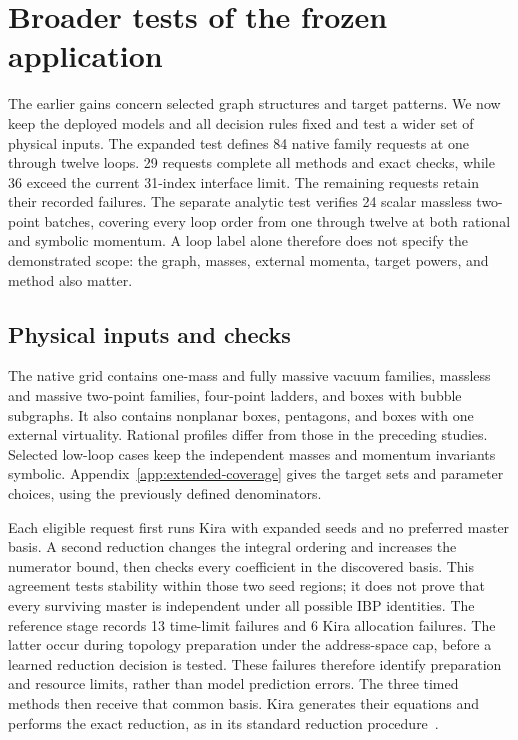 \section{Broader tests of the frozen application}
\label{sec:extended-coverage}
The earlier gains concern selected graph structures and target patterns. We now keep the deployed models and all decision rules fixed and test a wider set of physical inputs. The expanded test defines 84 native family requests at one through twelve loops. 29 requests complete all methods and exact checks, while 36 exceed the current 31-index interface limit. The remaining requests retain their recorded failures. The separate analytic test verifies 24 scalar massless two-point batches, covering every loop order from one through twelve at both rational and symbolic momentum. A loop label alone therefore does not specify the demonstrated scope: the graph, masses, external momenta, target powers, and method also matter.

\subsection{Physical inputs and checks}
The native grid contains one-mass and fully massive vacuum families, massless and massive two-point families, four-point ladders, and boxes with bubble subgraphs. It also contains nonplanar boxes, pentagons, and boxes with one external virtuality. Rational profiles differ from those in the preceding studies. Selected low-loop cases keep the independent masses and momentum invariants symbolic. Appendix~\ref{app:extended-coverage} gives the target sets and parameter choices, using the previously defined denominators.

Each eligible request first runs Kira with expanded seeds and no preferred master basis. A second reduction changes the integral ordering and increases the numerator bound, then checks every coefficient in the discovered basis. This agreement tests stability within those two seed regions; it does not prove that every surviving master is independent under all possible IBP identities. The reference stage records 13 time-limit failures and 6 Kira allocation failures. The latter occur during topology preparation under the address-space cap, before a learned reduction decision is tested. These failures therefore identify preparation and resource limits, rather than model prediction errors. The three timed methods then receive that common basis. Kira generates their equations and performs the exact reduction, as in its standard reduction procedure~\cite{KiraOriginal,Kira3}.

